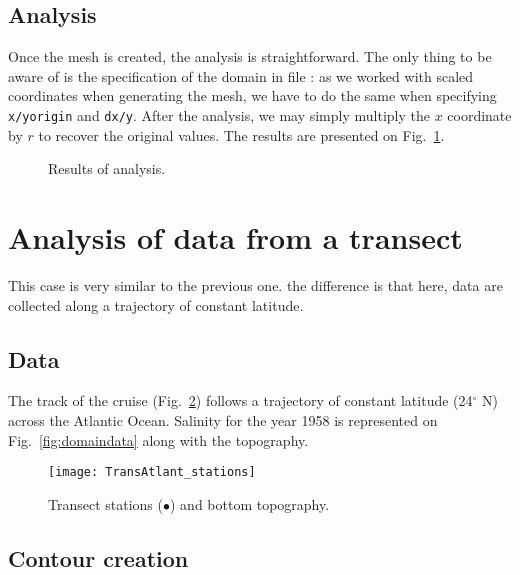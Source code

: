 \subsection{Analysis}

Once the mesh is created, the analysis is straightforward. The only thing to be aware of is the specification of the domain in file : as we worked with scaled coordinates when generating the mesh, we have to do the same when specifying \texttt{x/yorigin} and \texttt{dx/y}. After the analysis, we may simply multiply the $x$ coordinate by $r$ to recover the original values. The results are presented on Fig.~\ref{fig:analysis}.  

 
\begin{figure}[htpb]
\centering
{}
\caption{Results of analysis.\label{fig:analysis}}
\end{figure}





\section{Analysis of data from a transect}

This case is very similar to the previous one. the difference is that here, data are collected along a trajectory of constant latitude.
\subsection{Data}

The track of the cruise (Fig.~\ref{fig:transectprofiles}) follows a trajectory of constant latitude (24$^{\circ}$ N) across the Atlantic Ocean. Salinity for the year 1958 is represented on Fig.~\ref{fig:domaindata} along with the topography. 

\begin{figure}[htpb]
\centering
\texttt{[image: TransAtlant\_stations]}
\caption{Transect stations ($\bullet$) and bottom topography.\label{fig:transectprofiles}}
\end{figure}

\subsection{Contour creation}

